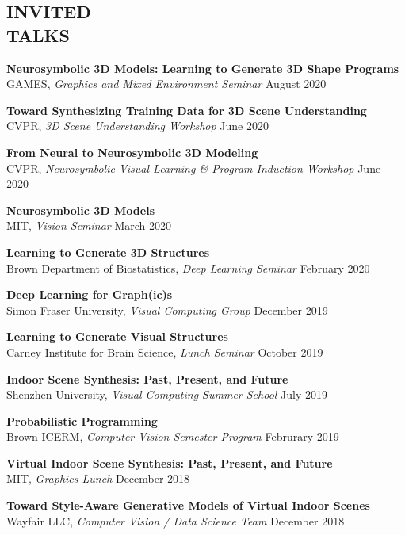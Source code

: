 \documentclass[line,margin]{res}
\begin{document}
\begin{resume}

\section{INVITED\\TALKS}

\newcommand{\talktitle}[1]{
	\textbf{#1}
}
\newcommand{\talk}[3]{
	#1, \emph{#2} \hfill #3
}

\talktitle{Neurosymbolic 3D Models: Learning to Generate 3D Shape Programs}\\
\talk
	{GAMES}
	{Graphics and Mixed Environment Seminar}
	{August 2020}

\talktitle{Toward Synthesizing Training Data for 3D Scene Understanding}\\
\talk
	{CVPR}
	{3D Scene Understanding Workshop}
	{June 2020}

\talktitle{From Neural to Neurosymbolic 3D Modeling}\\
\talk
	{CVPR}
	{Neurosymbolic Visual Learning \& Program Induction Workshop}
	{June 2020}

\talktitle{Neurosymbolic 3D Models}\\
\talk
	{MIT}
	{Vision Seminar}
	{March 2020}

\talktitle{Learning to Generate 3D Structures}\\
\talk
	{Brown Department of Biostatistics}
	{Deep Learning Seminar}
	{February 2020}

\talktitle{Deep Learning for Graph(ic)s}\\
\talk
	{Simon Fraser University}
	{Visual Computing Group}
	{December 2019}

\talktitle{Learning to Generate Visual Structures}\\
\talk
	{Carney Institute for Brain Science}
	{Lunch Seminar}
	{October 2019}

\talktitle{Indoor Scene Synthesis: Past, Present, and Future}\\
\talk
	{Shenzhen University}
	{Visual Computing Summer School}
	{July 2019}

\talktitle{Probabilistic Programming}\\
\talk
	{Brown ICERM}
	{Computer Vision Semester Program}
	{Februrary 2019}

\talktitle{Virtual Indoor Scene Synthesis: Past, Present, and Future}\\
\talk
	{MIT}
	{Graphics Lunch}
	{December 2018}

\talktitle{Toward Style-Aware Generative Models of Virtual Indoor Scenes}\\
\talk
	{Wayfair LLC}
	{Computer Vision / Data Science Team}
	{December 2018}


\end{resume}
\end{document}
